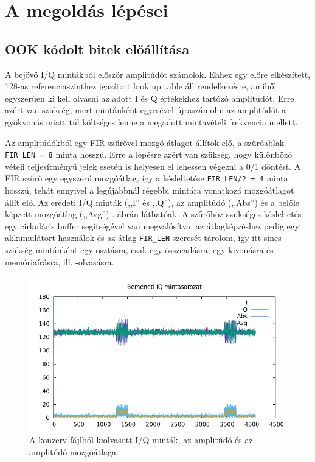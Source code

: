 \section{A megoldás lépései}
    \subsection{OOK kódolt bitek előállítása}
        A bejövő I/Q mintákból először amplitúdót számolok. Ehhez egy előre elkészített, 128-as referenciaszinthez igazított look up table áll rendelkezésre, amiből egyszerűen ki kell olvasni az adott I és Q értékekhez tartózó amplitúdót. Erre azért van szükség, mert mintánként egyesével újraszámolni az amplitúdót a gyökvonás miatt túl költséges lenne a megadott mintavételi frekvencia mellett.

        Az amplitúdókból egy FIR szűrővel mozgó átlagot állítok elő, a szűrőablak \verb|FIR_LEN = 8| minta hosszú. Erre a lépésre azért van szükség, hogy különböző vételi teljesítményű jelek esetén is helyesen el lehessen végezni a 0/1 döntést. A FIR szűrő egy egyszerű mozgóátlag, így a késleltetése \verb|FIR_LEN/2 = 4| minta hosszú, tehát ennyivel a legújabbnál régebbi mintára vonatkozó mozgóátlagot állít elő. Az eredeti I/Q minták (,,I'' és ,,Q''), az amplitúdó (,,Abs'') és a belőle képzett mozgóátlag (,,Avg'') . ábrán láthatóak. A szűrőhöz szükséges késleltetés egy cirkuláris buffer segítségével van megvalósítva, az átlagképzéshez pedig egy akkumulátort használok és az átlag \verb|FIR_LEN|-szeresét tárolom, így itt sincs szükség mintánként egy osztásra, csak egy összeadásra, egy kivonásra és memóriaírásra, ill. -olvasásra.
        \begin{figure}
            \centering
            \includegraphics[width=\textwidth]{kep/signals.pdf}
            \caption{A konzerv fájlból kiolvasott I/Q minták, az amplitúdó és az amplitúdó mozgóátlaga.}
            \label{fig:signals}
        \end{figure}

